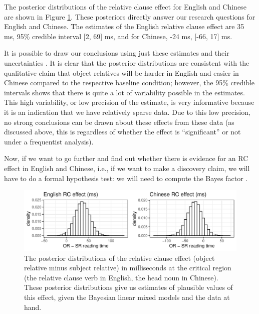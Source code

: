 \documentclass{ar-1col}\usepackage[]{graphicx}\usepackage[]{color}
\makeatletter
\def\maxwidth{ %
  \ifdim\Gin@nat@width>\linewidth
    \linewidth
  \else
    \Gin@nat@width
  \fi
}
\newenvironment{knitrout}{}{} %
\makeatother
\begin{document}
The posterior distributions of the relative clause effect for English and Chinese are shown in Figure \ref{fig:posteriors}. These posteriors directly answer our research questions for English and Chinese.  The estimates of the English relative clause effect are 35 ms, 95\% credible interval [2, 69] ms, and for Chinese,
-24 ms, [-66, 17] ms.

It is possible to draw our conclusions using just these estimates and their uncertainties  \citep{kruschke2010believe,kruschke2018bayesian}.
It is clear that the posterior distributions are consistent with the qualitative claim that object relatives will be harder in English and easier in Chinese compared to the respective baseline condition; however, the 95\% credible intervals shows that there is quite a lot of variability possible in the estimates. This high variability, or low precision of the estimate, is very informative because it is an indication that we have relatively sparse data. Due to this low precision, no strong conclusions can be drawn about these effects from these data (as discussed above, this is regardless of whether the effect is ``significant'' or not under a frequentist analysis).

Now, if we want to go further and find out whether there is evidence for an RC effect in English and Chinese, i.e., if we want to make a discovery claim, we will have to do a formal hypothesis test: we will need to compute the Bayes factor  \citep{kass1995bayes}.

\begin{figure}
\centering
\begin{knitrout}
\color{fgcolor}

{\centering \includegraphics[width=\maxwidth]{figures/fig-unnamed-chunk-16-1} 

}


\end{knitrout}
\caption{The posterior distributions of the relative clause effect (object relative minus subject relative) in milliseconds at the critical region (the relative clause verb in English, the head noun in Chinese). These posterior distributions give us estimates of plausible values of this effect, given the Bayesian linear mixed models and the data at hand.}\label{fig:posteriors}
\end{figure}
\end{document}
